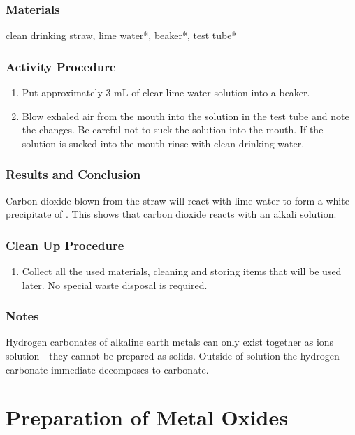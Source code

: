 \subsubsection*{Materials}
clean drinking straw, lime water*, beaker*, test tube*

\subsubsection*{Activity Procedure}
\begin{enumerate}
\item{Put approximately 3 mL of clear lime water solution into a beaker.}
\item{Blow exhaled air from the mouth into the solution in the test tube and note the changes. Be careful not to suck the solution into the mouth. If the solution is sucked into the mouth rinse with clean drinking water.}
\end{enumerate}

\subsubsection*{Results and Conclusion}
Carbon dioxide blown from the straw will react with lime water  to form a white precipitate of . This shows that carbon dioxide reacts with an alkali solution.

\subsubsection*{Clean Up Procedure}
\begin{enumerate}
\item{Collect all the used materials, cleaning and storing items that will be used later. No special waste disposal is required.}
\end{enumerate}

\subsubsection*{Notes}
Hydrogen carbonates of alkaline earth metals can only exist together as ions solution - they cannot be prepared as solids. Outside of solution the hydrogen carbonate immediate decomposes to carbonate.

\section{Preparation of Metal Oxides}

